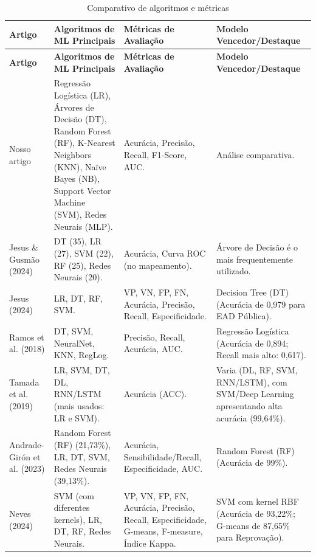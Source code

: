 \documentclass[english, spanish, brazilian]{RBIEarticle} %
\begin{document}
\begin{longtable}{|p{3cm}|p{3.5cm}|p{4.5cm}|p{5cm}|}
    \caption{Comparativo de algoritmos e métricas}\\
    \toprule
    \textbf{Artigo} & \textbf{Algoritmos de ML Principais} & \textbf{Métricas de Avaliação} & \textbf{Modelo Vencedor/Destaque} \\
    \midrule
    \endfirsthead
    \toprule
    \textbf{Artigo} & \textbf{Algoritmos de ML Principais} & \textbf{Métricas de Avaliação} & \textbf{Modelo Vencedor/Destaque} \\
    \midrule
    \endhead
    Nosso artigo & Regressão Logística (LR), Árvores de Decisão (DT), Random Forest (RF), K-Nearest Neighbors (KNN), Naïve Bayes (NB), Support Vector Machine (SVM), Redes Neurais (MLP). & Acurácia, Precisão, Recall, F1-Score, AUC. & Análise comparativa. \\ \hline
    
    Jesus \& Gusmão (2024) & DT (35), LR (27), SVM (22), RF (25), Redes Neurais (20). & Acurácia, Curva ROC (no mapeamento). & Árvore de Decisão é o mais frequentemente utilizado. \\ \hline
    
    Jesus (2024) & LR, DT, RF, SVM. & VP, VN, FP, FN, Acurácia, Precisão, Recall, Especificidade. & Decision Tree (DT) (Acurácia de 0,979 para EAD Pública). \\ \hline
    
    Ramos et al. (2018) & DT, SVM, NeuralNet, KNN, RegLog. & Precisão, Recall, Acurácia, AUC. & Regressão Logística (Acurácia de 0,894; Recall mais alto: 0,617). \\ \hline
    
    Tamada et al. (2019) & LR, SVM, DT, DL, RNN/LSTM (mais usados: LR e SVM). & Acurácia (ACC). & Varia (DL, RF, SVM, RNN/LSTM), com SVM/Deep Learning apresentando alta acurácia (99,64\%). \\ \hline
    
    Andrade-Girón et al. (2023) & Random Forest (RF) (21,73\%), LR, DT, SVM, Redes Neurais (39,13\%). & Acurácia, Sensibilidade/Recall, Especificidade, AUC. & Random Forest (RF) (Acurácia de 99\%). \\ \hline
    
    Neves (2024) & SVM (com diferentes kernels), LR, DT, RF, Redes Neurais. & VP, VN, FP, FN, Acurácia, Precisão, Recall, Especificidade, G-means, F-measure, Índice Kappa. & SVM com kernel RBF (Acurácia de 93,22\%; G-means de 87,65\% para Reprovação). \\ 
    \bottomrule
\end{longtable}
\end{document}
